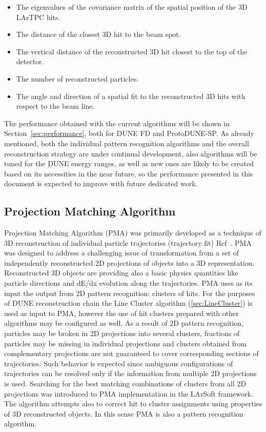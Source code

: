 \begin{itemize}
\item The eigenvalues of the covariance matrix of the spatial position of the 3D LArTPC hits.
\item The distance of the closest 3D hit to the beam spot.
\item The vertical distance of the reconstructed 3D hit closest to the top of the detector.  
\item The number of reconstructed particles.
\item The angle and direction of a spatial fit to the reconstructed 3D hits with respect to the beam line.
\end{itemize}

The performance obtained with the current algorithms will be shown in Section~\ref{sec:performance}, both for DUNE FD and ProtoDUNE-SP.  As already mentioned, both the individual pattern recognition algorithms and the overall reconstruction strategy are under continual development, also algorithms will be tuned for the DUNE energy ranges, as well as new ones are likely to be created based on its necessities in the near future, so the performance presented in this document is expected to improve with future dedicated work. 


\subsection{Projection Matching Algorithm}\label{sec:PMA}
Projection Matching Algorithm (PMA) was primarily developed as a technique of 3D reconstruction of individual particle trajectories (trajectory fit) Ref~\cite{Antonello:2012hu}. PMA was designed to address a challenging issue of transformation from a set of independently reconstructed 2D projections of objects into a 3D representation. Reconstructed 3D objects are providing also a basic physics quantities like particle directions and dE/dx evolution along the trajectories. PMA uses as its input the output from 2D pattern recognition: clusters of hits. For the purposes of DUNE reconstruction chain the Line Cluster algorithm (\ref{sec:LineCluster}) is used as input to PMA, however the use of hit clusters prepared with other algorithms may be configured as well. As a result of 2D pattern recognition, particles may be broken in 2D projections into several clusters, fractions of particles may be missing in individual projections and clusters obtained from complementary projections are not guaranteed to cover corresponding sections of trajectories. Such behavior is expected since ambiguous configurations of trajectories can be resolved only if the information from multiple 2D projections is used. Searching for the best matching combinations of clusters from all 2D projections was introduced to PMA implementation in the LArSoft framework. The algorithm attempts also to correct hit to cluster assignments using properties of 3D reconstructed objects. In this sense PMA is also a pattern recognition algorithm.

